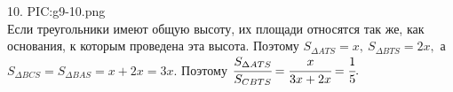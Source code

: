 10. {{PIC:g9-10.png}}\\
Если треугольники имеют общую высоту, их площади относятся так же, как основания, к которым проведена эта высота. Поэтому $S_{\Delta ATS}=x,\ S_{\Delta BTS}=2x,$ а $S_{\Delta BCS}=S_{\Delta BAS}=x+2x=3x.$ Поэтому $\cfrac{S_{\Delta ATS}}{S_{CBTS}}=\cfrac{x}{3x+2x}=\cfrac{1}{5}.$\\

